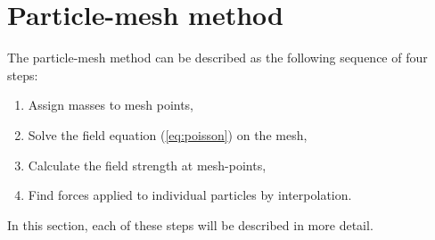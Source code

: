 \chapter{Particle-mesh method} %
The particle-mesh method can be described as the following sequence of four steps:
\begin{enumerate}
    \item Assign masses to mesh points,
    \item Solve the field equation (\autoref{eq:poisson}) on the mesh,
    \item Calculate the field strength at mesh-points,
    \item Find forces applied to individual particles by interpolation.
\end{enumerate}
In this section, each of these steps will be described in more detail.







